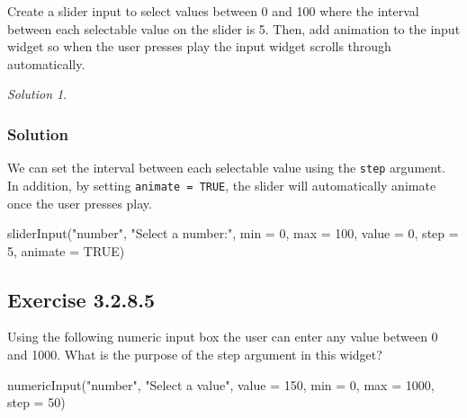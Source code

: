 \documentclass[
]{book}
\newenvironment{Shaded}{\begin{snugshade}}{\end{snugshade}}
\newcommand{\AttributeTok}[1]{\textcolor[rgb]{0.77,0.63,0.00}{#1}}
\newcommand{\ConstantTok}[1]{\textcolor[rgb]{0.00,0.00,0.00}{#1}}
\newcommand{\DecValTok}[1]{\textcolor[rgb]{0.00,0.00,0.81}{#1}}
\newcommand{\FunctionTok}[1]{\textcolor[rgb]{0.00,0.00,0.00}{#1}}
\newcommand{\NormalTok}[1]{#1}
\newcommand{\StringTok}[1]{\textcolor[rgb]{0.31,0.60,0.02}{#1}}
\theoremstyle{definition}
\theoremstyle{definition}
\theoremstyle{definition}
\theoremstyle{definition}
\theoremstyle{remark}
\newtheorem*{solution}{Solution}
\begin{document}
Create a slider input to select values between 0 and 100 where the interval
between each selectable value on the slider is 5. Then, add animation to the
input widget so when the user presses play the input widget scrolls through
automatically.

\begin{solution}
\leavevmode

\hypertarget{solution-8}{%
\subsubsection*{Solution}\label{solution-8}}

We can set the interval between each selectable value using the \texttt{step}
argument. In addition, by setting \texttt{animate\ =\ TRUE}, the slider will
automatically animate once the user presses play.

\begin{Shaded}
\begin{Highlighting}[]
  \FunctionTok{sliderInput}\NormalTok{(}\StringTok{"number"}\NormalTok{, }\StringTok{"Select a number:"}\NormalTok{,}
              \AttributeTok{min =} \DecValTok{0}\NormalTok{, }\AttributeTok{max =} \DecValTok{100}\NormalTok{, }\AttributeTok{value =} \DecValTok{0}\NormalTok{, }
              \AttributeTok{step =} \DecValTok{5}\NormalTok{, }\AttributeTok{animate =} \ConstantTok{TRUE}\NormalTok{)}
\end{Highlighting}
\end{Shaded}

\end{solution}

\hypertarget{exercise-3.2.8.5}{%
\subsection*{Exercise 3.2.8.5}\label{exercise-3.2.8.5}}

Using the following numeric input box the user can enter any value between 0
and 1000. What is the purpose of the step argument in this widget?

\begin{Shaded}
\begin{Highlighting}[]
\FunctionTok{numericInput}\NormalTok{(}\StringTok{"number"}\NormalTok{, }\StringTok{"Select a value"}\NormalTok{, }\AttributeTok{value =} \DecValTok{150}\NormalTok{, }\AttributeTok{min =} \DecValTok{0}\NormalTok{, }\AttributeTok{max =} \DecValTok{1000}\NormalTok{, }\AttributeTok{step =} \DecValTok{50}\NormalTok{)}
\end{Highlighting}
\end{Shaded}
\end{document}
